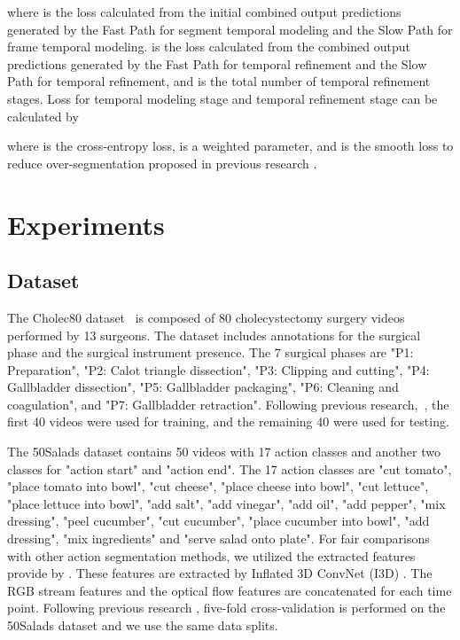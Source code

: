 \documentclass[sn-mathphys,Numbered]{sn-jnl}
\theoremstyle{thmstyleone}\newtheorem{theorem}{Theorem}\newtheorem{proposition}[theorem]{Proposition}
\theoremstyle{thmstyletwo}\newtheorem{example}{Example}\newtheorem{remark}{Remark}
\theoremstyle{thmstylethree}\newtheorem{definition}{Definition}
\begin{document}
where  is the loss calculated from the initial combined output predictions generated by the Fast Path for segment temporal modeling and the Slow Path for frame temporal modeling.  is the loss calculated from the combined output predictions generated by the Fast Path for temporal refinement and the Slow Path for temporal refinement, and  is the total number of temporal refinement stages. Loss  for temporal modeling stage  and temporal refinement stage  can be calculated by



where  is the cross-entropy loss,  is a weighted parameter, and  is the smooth loss to reduce over-segmentation proposed in previous research \cite{farha2019ms,li2020ms}.


\section{Experiments}
\subsection{Dataset}
The Cholec80 dataset~\cite{twinanda2016endonet} is composed of 80 cholecystectomy surgery videos performed by 13 surgeons. The dataset includes annotations for the surgical phase and the surgical instrument presence. The 7 surgical phases are "P1: Preparation", "P2: Calot triangle dissection", "P3: Clipping and cutting", "P4: Gallbladder dissection", "P5: Gallbladder packaging", "P6: Cleaning and coagulation", and "P7: Gallbladder retraction". Following previous research,~\cite{twinanda2016endonet,wang2022less,yi2022not}, the first 40 videos were used for training, and the remaining 40 were used for testing.

The 50Salads dataset \cite{stein2013combining} contains 50 videos with 17 action classes and another two classes for "action start" and "action end". The 17 action classes are "cut tomato", "place tomato into bowl", "cut cheese", "place cheese into bowl", "cut lettuce", "place lettuce into bowl", "add salt", "add vinegar", "add oil", "add pepper", "mix dressing", "peel cucumber", "cut cucumber", "place cucumber into bowl", "add dressing", "mix ingredients" and "serve salad onto plate". For fair comparisons with other action segmentation methods, we utilized the extracted features provide by \cite{farha2019ms}. These features are extracted by Inflated 3D ConvNet (I3D) \cite{carreira2017quo}. The RGB stream features and the optical flow features are concatenated for each time point. Following previous research \cite{farha2019ms,li2020ms,yi2021asformer,wang2022cross,park2022maximization,liu2023diffusion}, five-fold cross-validation is performed on the 50Salads dataset and we use the same data splits.
\end{document}
